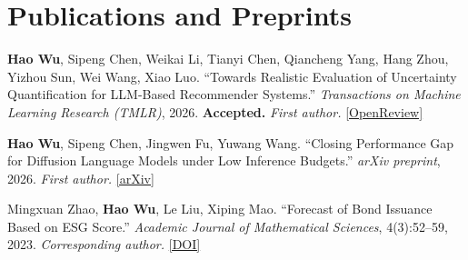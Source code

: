 \documentclass[10pt,a4paper]{article}
\begin{document}
\section{Publications and Preprints}
\begin{enumerate}[label={[\arabic*]},start=1]

  \item \textbf{Hao Wu}, Sipeng Chen, Weikai Li, Tianyi Chen, Qiancheng Yang, Hang Zhou, Yizhou Sun, Wei Wang, Xiao Luo.
  \textquotedblleft Towards Realistic Evaluation of Uncertainty Quantification for LLM-Based Recommender Systems.\textquotedblright{}
  \textit{Transactions on Machine Learning Research (TMLR)}, 2026.
  \textbf{Accepted.}
  \textit{First author.}
   \href{https://openreview.net/forum?id=GXDe6REdu3}{[OpenReview]}
   
  \item \textbf{Hao Wu}, Sipeng Chen, Jingwen Fu, Yuwang Wang.
  \textquotedblleft Closing Performance Gap for Diffusion Language Models under Low Inference Budgets.\textquotedblright{}
  \textit{arXiv preprint}, 2026.
  \textit{First author.}
  \href{https://arxiv.org/abs/2611.25763}{[arXiv]}

  \item Mingxuan Zhao, \textbf{Hao Wu}, Le Liu, Xiping Mao.
  \textquotedblleft Forecast of Bond Issuance Based on ESG Score.\textquotedblright{}
  \textit{Academic Journal of Mathematical Sciences}, 4(3):52--59, 2023.
  \textit{Corresponding author.}
  \href{https://doi.org/10.25236/AJMS.2023.040309}{[DOI]}

\end{enumerate}
\end{document}
